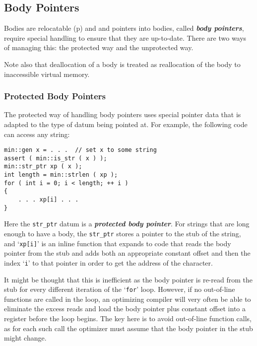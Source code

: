 \documentclass[12pt]{article}
\newcommand{\key}[1]{{\bf \em #1}\index{#1}}
\newcommand{\skey}[2]{{\bf \em #1#2}\index{#1}}
\newcommand{\pagref}[1]{p\pageref{#1}}
\newenvironment{indpar}[1][0.3in]%
	{\begin{list}{}%
		     {\setlength{\itemsep}{0in}%
		      \setlength{\topsep}{0in}%
		      \setlength{\parsep}{1ex}%
		      \setlength{\labelwidth}{#1}%
		      \setlength{\leftmargin}{#1}%
		      \addtolength{\leftmargin}{\labelsep}}%
	 \item}%
	{\end{list}}
\begin{document}
\subsection{Body Pointers}
\label{BODY-POINTERS}

Bodies are relocatable
(\pagref{RELOCATABLE-BODY}) and and pointers into bodies,
called \skey{body pointer}s,
require special handling to
ensure that they are up-to-date.  There are two ways of managing
this: the protected way and the unprotected way.

Note also that deallocation of a body is treated as
reallocation of the body to inaccessible virtual memory.

\subsubsection{Protected Body Pointers}
\label{PROTECTED-BODY-POINTERS}

The protected way of handling body pointers
uses special pointer data that is adapted to
the type of datum being pointed at.  For example, the following
code can access any string:
\begin{indpar}\begin{verbatim}
min::gen x = . . .  // set x to some string
assert ( min::is_str ( x ) );
min::str_ptr xp ( x );
int length = min::strlen ( xp );
for ( int i = 0; i < length; ++ i )
{
    . . . xp[i] . . .
}
\end{verbatim}\end{indpar}

Here the \verb|str_ptr| datum is a \key{protected body pointer}.
For strings that are long enough to have a body, the
\verb|str_ptr| stores a pointer to the stub of the string,
and `\verb|xp[i]|' is an inline function that expands to
code that reads the body pointer from the stub and adds both
an appropriate constant offset and then the index `\verb|i|'
to that pointer in order to get the address of the character.

It might be thought that this is inefficient as the body pointer
is re-read from the stub for every different iteration of the `\verb|for|'
loop.  However, if no out-of-line functions are called in the
loop, an optimizing compiler will very often be able to eliminate
the excess reads and load the body pointer plus constant offset
into a register before the loop begins.  The key here is to
avoid out-of-line function calls, as for each such call the
optimizer must assume that the body pointer in the stub might
change.
\end{document}
